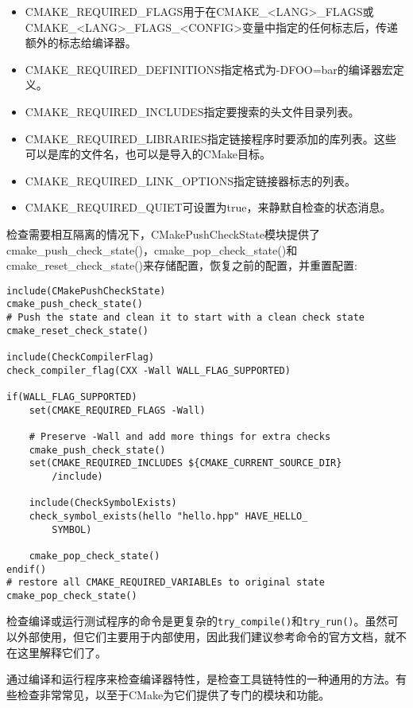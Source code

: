 \begin{itemize}
\item 
CMAKE\_REQUIRED\_FLAGS用于在CMAKE\_<LANG>\_FLAGS或CMAKE\_<LANG>\_FLAGS\_<CONFIG>变量中指定的任何标志后，传递额外的标志给编译器。

\item 
CMAKE\_REQUIRED\_DEFINITIONS指定格式为-DFOO=bar的编译器宏定义。

\item 
CMAKE\_REQUIRED\_INCLUDES指定要搜索的头文件目录列表。

\item 
CMAKE\_REQUIRED\_LIBRARIES指定链接程序时要添加的库列表。这些可以是库的文件名，也可以是导入的CMake目标。

\item 
CMAKE\_REQUIRED\_LINK\_OPTIONS指定链接器标志的列表。

\item
CMAKE\_REQUIRED\_QUIET可设置为true，来静默自检查的状态消息。
\end{itemize}

检查需要相互隔离的情况下，CMakePushCheckState模块提供了cmake\_push\_check\_state()，cmake\_pop\_check\_state()和cmake\_reset\_check\_state()来存储配置，恢复之前的配置，并重置配置:

\begin{lstlisting}[style=styleCMake]
include(CMakePushCheckState)
cmake_push_check_state()
# Push the state and clean it to start with a clean check state
cmake_reset_check_state()

include(CheckCompilerFlag)
check_compiler_flag(CXX -Wall WALL_FLAG_SUPPORTED)

if(WALL_FLAG_SUPPORTED)
	set(CMAKE_REQUIRED_FLAGS -Wall)
	
	# Preserve -Wall and add more things for extra checks
	cmake_push_check_state()
	set(CMAKE_REQUIRED_INCLUDES ${CMAKE_CURRENT_SOURCE_DIR}
		/include)

	include(CheckSymbolExists)
	check_symbol_exists(hello "hello.hpp" HAVE_HELLO_
		SYMBOL)
	
	cmake_pop_check_state()
endif()
# restore all CMAKE_REQUIRED_VARIABLEs to original state
cmake_pop_check_state()
\end{lstlisting}

检查编译或运行测试程序的命令是更复杂的\texttt{try\_compile()}和\texttt{try\_run()}。虽然可以外部使用，但它们主要用于内部使用，因此我们建议参考命令的官方文档，就不在这里解释它们了。

通过编译和运行程序来检查编译器特性，是检查工具链特性的一种通用的方法。有些检查非常常见，以至于CMake为它们提供了专门的模块和功能。

